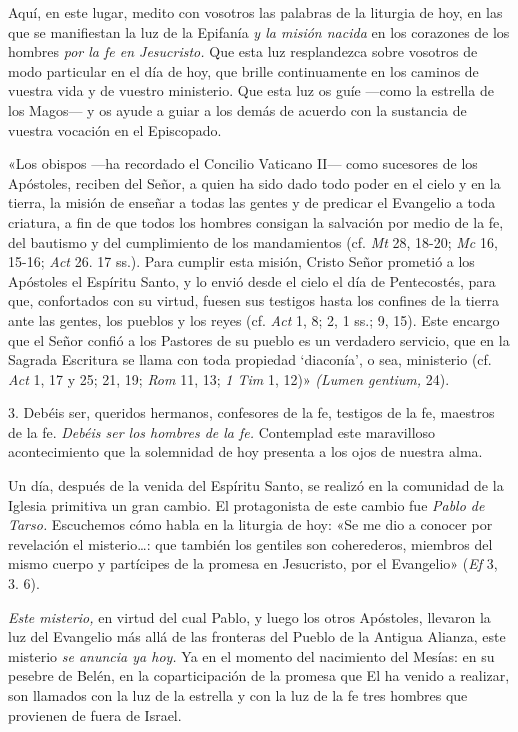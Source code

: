 \documentclass[]{article}
\begin{document}
Aquí, en este lugar, medito con vosotros las palabras de la liturgia de
hoy, en las que se manifiestan la luz de la Epifanía \emph{y la misión
nacida} en los corazones de los hombres \emph{por la fe en Jesucristo.}
Que esta luz resplandezca sobre vosotros de modo particular en el día de
hoy, que brille continuamente en los caminos de vuestra vida y de
vuestro ministerio. Que esta luz os guíe ---como la estrella de los
Magos--- y os ayude a guiar a los demás de acuerdo con la sustancia de
vuestra vocación en el Episcopado.

«Los obispos ---ha recordado el Concilio Vaticano II--- como sucesores
de los Apóstoles, reciben del Señor, a quien ha sido dado todo poder en
el cielo y en la tierra, la misión de enseñar a todas las gentes y de
predicar el Evangelio a toda criatura, a fin de que todos los hombres
consigan la salvación por medio de la fe, del bautismo y del
cumplimiento de los mandamientos (cf. \emph{Mt} 28, 18-20; \emph{Mc} 16,
15-16; \emph{Act} 26. 17 ss.). Para cumplir esta misión, Cristo Señor
prometió a los Apóstoles el Espíritu Santo, y lo envió desde el cielo el
día de Pentecostés, para que, confortados con su virtud, fuesen sus
testigos hasta los confines de la tierra ante las gentes, los pueblos y
los reyes (cf. \emph{Act} 1, 8; 2, 1 ss.; 9, 15). Este encargo que el
Señor confió a los Pastores de su pueblo es un verdadero servicio, que
en la Sagrada Escritura se llama con toda propiedad `diaconía', o sea,
ministerio (cf. \emph{Act} 1, 17 y 25; 21, 19; \emph{Rom} 11, 13;
\emph{1 Tim} 1, 12)» \emph{(Lumen gentium,} 24).

3. Debéis ser, queridos hermanos, confesores de la fe, testigos de la
fe, maestros de la fe. \emph{Debéis ser los hombres de la fe.}
Contemplad este maravilloso acontecimiento que la solemnidad de hoy
presenta a los ojos de nuestra alma.

Un día, después de la venida del Espíritu Santo, se realizó en la
comunidad de la Iglesia primitiva un gran cambio. El protagonista de
este cambio fue \emph{Pablo de Tarso.} Escuchemos cómo habla en la
liturgia de hoy: «Se me dio a conocer por revelación el
misterio\ldots{}: que también los gentiles son coherederos, miembros del
mismo cuerpo y partícipes de la promesa en Jesucristo, por el Evangelio»
(\emph{Ef} 3, 3. 6).

\emph{Este misterio,} en virtud del cual Pablo, y luego los otros
Apóstoles, llevaron la luz del Evangelio más allá de las fronteras del
Pueblo de la Antigua Alianza, este misterio \emph{se anuncia ya hoy.} Ya
en el momento del nacimiento del Mesías: en su pesebre de Belén, en la
coparticipación de la promesa que El ha venido a realizar, son llamados
con la luz de la estrella y con la luz de la fe tres hombres que
provienen de fuera de Israel.
\end{document}
